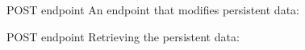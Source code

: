 \documentclass[../index.tex]{subfiles}
\begin{document}
\begin{frame}[fragile]{\currenttitle}
\end{frame}

\renewcommand{\currenttitle}{POST endpoint}
\begin{frame}[fragile]{\currenttitle}
  An endpoint that modifies persistent data: \\
  \vspace*{1em}

\end{frame}

\begin{frame}[fragile]{\currenttitle}
  Retrieving the persistent data: \\
  \vspace*{1em}

\end{frame}
\end{document}
